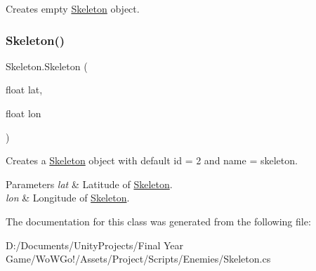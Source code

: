 Creates empty \mbox{\hyperlink{class_skeleton}{Skeleton}} object. 

\mbox{\label{class_skeleton_a46c25f00abbbdfb8a0ab268285f13cb9}} 
\subsubsection{\texorpdfstring{Skeleton()}{Skeleton()}\hspace{0.1cm}{\footnotesize\ttfamily [2/2]}}
{\footnotesize\ttfamily Skeleton.\+Skeleton (\begin{DoxyParamCaption}\item[{float}]{lat,  }\item[{float}]{lon }\end{DoxyParamCaption})}



Creates a \mbox{\hyperlink{class_skeleton}{Skeleton}} object with default id = 2 and name = skeleton. 


\begin{DoxyParams}{Parameters}
{\em lat} & Latitude of \mbox{\hyperlink{class_skeleton}{Skeleton}}.\\
\hline
{\em lon} & Longitude of \mbox{\hyperlink{class_skeleton}{Skeleton}}.\\
\hline
\end{DoxyParams}


The documentation for this class was generated from the following file\+:\begin{DoxyCompactItemize}
\item 
D\+:/\+Documents/\+Unity\+Projects/\+Final Year Game/\+Wo\+W\+Go!/\+Assets/\+Project/\+Scripts/\+Enemies/Skeleton.\+cs\end{DoxyCompactItemize}
